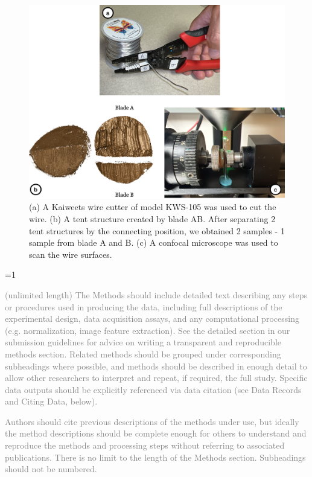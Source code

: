 \documentclass[fleqn,10pt]{wlscirep}
\newcommand{\ifinstruction}{1} %
\begin{document}
\begin{figure}[ht]
\centering
\includegraphics[width=0.9\linewidth]{cut-tent-scan.png}
\caption{(a) A Kaiweets wire cutter of model KWS-105 was used to cut the wire. (b) A tent structure created by blade AB. After separating 2 tent structures by the connecting position, we obtained 2 samples - 1 sample from blade A and B. (c) A confocal microscope was used to scan the wire surfaces.}
\label{fig: cut-tent-scan}
\end{figure}

\ifnum \ifinstruction=1

\textcolor{gray}{(unlimited length) The Methods should include detailed text describing any steps or procedures used in producing the data, including full descriptions of the experimental design, data acquisition assays, and any computational processing (e.g. normalization, image feature extraction). See the detailed section in our submission guidelines for advice on writing a transparent and reproducible methods section. Related methods should be grouped under corresponding subheadings where possible, and methods should be described in enough detail to allow other researchers to interpret and repeat, if required, the full study. Specific data outputs should be explicitly referenced via data citation (see Data Records and Citing Data, below).}

\textcolor{gray}{Authors should cite previous descriptions of the methods under use, but ideally the method descriptions should be complete enough for others to understand and reproduce the methods and processing steps without referring to associated publications. There is no limit to the length of the Methods section. Subheadings should not be numbered.}
\end{document}
